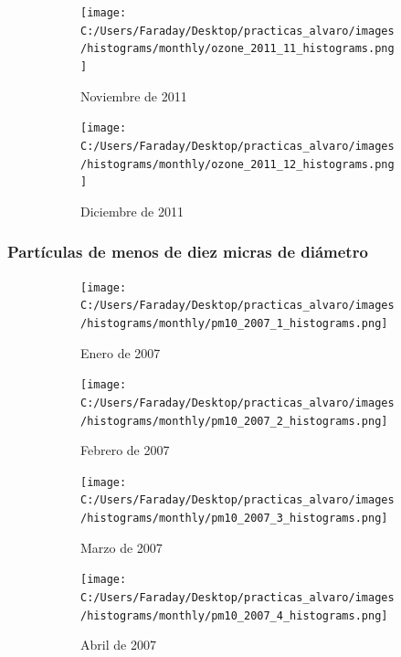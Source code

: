 \documentclass[12pt]{article}
\begin{document}
\begin{figure}[H]
\centering
\begin{subfigure}[h]{0.45\textwidth}
\texttt{[image: C:/Users/Faraday/Desktop/practicas\_alvaro/images/histograms/monthly/ozone\_2011\_11\_histograms.png]}
\caption{Noviembre de 2011}
\label{fig:hist-mon-2-11-2011}
\end{subfigure}
%
\begin{subfigure}[H]{0.45\textwidth}
\texttt{[image: C:/Users/Faraday/Desktop/practicas\_alvaro/images/histograms/monthly/ozone\_2011\_12\_histograms.png]}
\caption{Diciembre de 2011}
\label{fig:hist-mon-2-12-2011}
\end{subfigure}
\caption{}
\end{figure}

\newpage

\subsubsection*{Partículas de menos de diez micras de diámetro}
%

\begin{figure}[H]
\centering
\begin{subfigure}[h]{0.45\textwidth}
\texttt{[image: C:/Users/Faraday/Desktop/practicas\_alvaro/images/histograms/monthly/pm10\_2007\_1\_histograms.png]}
\caption{Enero de 2007}
\label{fig:hist-mon-3-1-2007}
\end{subfigure}
%
\begin{subfigure}[H]{0.45\textwidth}
\texttt{[image: C:/Users/Faraday/Desktop/practicas\_alvaro/images/histograms/monthly/pm10\_2007\_2\_histograms.png]}
\caption{Febrero de 2007}
\label{fig:hist-mon-3-2-2007}
\end{subfigure}
\caption{}
\end{figure}

\begin{figure}[H]
\centering
\begin{subfigure}[h]{0.45\textwidth}
\texttt{[image: C:/Users/Faraday/Desktop/practicas\_alvaro/images/histograms/monthly/pm10\_2007\_3\_histograms.png]}
\caption{Marzo de 2007}
\label{fig:hist-mon-3-3-2007}
\end{subfigure}
%
\begin{subfigure}[H]{0.45\textwidth}
\texttt{[image: C:/Users/Faraday/Desktop/practicas\_alvaro/images/histograms/monthly/pm10\_2007\_4\_histograms.png]}
\caption{Abril de 2007}
\label{fig:hist-mon-3-4-2007}
\end{subfigure}
\caption{}
\end{figure}
\end{document}
